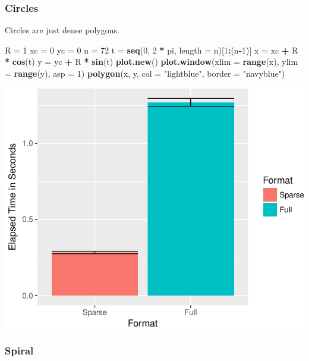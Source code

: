\documentclass[]{book}
\newenvironment{Shaded}{\begin{snugshade}}{\end{snugshade}}
\newcommand{\KeywordTok}[1]{\textcolor[rgb]{0.13,0.29,0.53}{\textbf{#1}}}
\newcommand{\DataTypeTok}[1]{\textcolor[rgb]{0.13,0.29,0.53}{#1}}
\newcommand{\DecValTok}[1]{\textcolor[rgb]{0.00,0.00,0.81}{#1}}
\newcommand{\StringTok}[1]{\textcolor[rgb]{0.31,0.60,0.02}{#1}}
\newcommand{\OperatorTok}[1]{\textcolor[rgb]{0.81,0.36,0.00}{\textbf{#1}}}
\newcommand{\NormalTok}[1]{#1}
\theoremstyle{definition}
\theoremstyle{definition}
\theoremstyle{definition}
\theoremstyle{remark}
\begin{document}
\subsubsection{Circles}\label{circles}

Circles are just dense polygons.

\begin{Shaded}
\begin{Highlighting}[]
\NormalTok{R =}\StringTok{ }\DecValTok{1}
\NormalTok{xc =}\StringTok{ }\DecValTok{0}
\NormalTok{yc =}\StringTok{ }\DecValTok{0}
\NormalTok{n =}\StringTok{ }\DecValTok{72}
\NormalTok{t =}\StringTok{ }\KeywordTok{seq}\NormalTok{(}\DecValTok{0}\NormalTok{, }\DecValTok{2} \OperatorTok{*}\StringTok{ }\NormalTok{pi, }\DataTypeTok{length =}\NormalTok{ n)[}\DecValTok{1}\OperatorTok{:}\NormalTok{(n}\OperatorTok{-}\DecValTok{1}\NormalTok{)]}
\NormalTok{x =}\StringTok{ }\NormalTok{xc }\OperatorTok{+}\StringTok{ }\NormalTok{R }\OperatorTok{*}\StringTok{ }\KeywordTok{cos}\NormalTok{(t)}
\NormalTok{y =}\StringTok{ }\NormalTok{yc }\OperatorTok{+}\StringTok{ }\NormalTok{R }\OperatorTok{*}\StringTok{ }\KeywordTok{sin}\NormalTok{(t)}
\KeywordTok{plot.new}\NormalTok{()}
\KeywordTok{plot.window}\NormalTok{(}\DataTypeTok{xlim =} \KeywordTok{range}\NormalTok{(x), }\DataTypeTok{ylim =} \KeywordTok{range}\NormalTok{(y), }\DataTypeTok{asp =} \DecValTok{1}\NormalTok{)}
\KeywordTok{polygon}\NormalTok{(x, y, }\DataTypeTok{col =} \StringTok{"lightblue"}\NormalTok{, }\DataTypeTok{border =} \StringTok{"navyblue"}\NormalTok{)}
\end{Highlighting}
\end{Shaded}

\includegraphics[width=0.5\linewidth]{Rcourse_files/figure-latex/unnamed-chunk-262-1}

\subsubsection{Spiral}\label{spiral}
\end{document}
